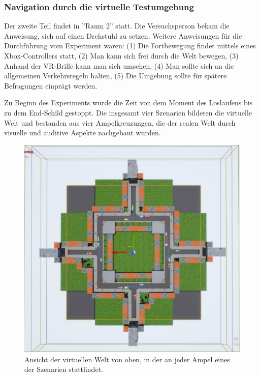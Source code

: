 \documentclass{Paper}
\begin{document}
\subsubsection{Navigation durch die virtuelle Testumgebung}
Der zweite Teil findet in ''Raum 2'' statt. Die Versuchsperson bekam die Anweisung, sich auf einen Drehstuhl zu setzen. Weitere Anweisungen für die Durchführung vom Experiment waren: (1) Die Fortbewegung findet mittels eines Xbox-Controllers statt, (2) Man kann sich frei durch die Welt bewegen, (3) Anhand der VR-Brille kann man sich umsehen, (4) Man sollte sich an die allgemeinen Verkehrsregeln halten, (5) Die Umgebung sollte für spätere Befragungen einprägt werden.

Zu Beginn des Experiments wurde die Zeit von dem Moment des Loslaufens bis zu dem End-Schild gestoppt. %
Die insgesamt vier Szenarien bildeten die virtuelle Welt und bestanden aus vier Ampelkreuzungen, die der realen Welt durch visuelle und auditive Aspekte nachgebaut wurden.

\begin{figure}[H]
	\centering
	\includegraphics[scale=0.7]{../Bilder/map.png}
	\caption{Ansicht der virtuellen Welt von oben, in der an jeder Ampel eines der Szenarien stattfindet.}
	\label{img:map}
\end{figure}
\end{document}
